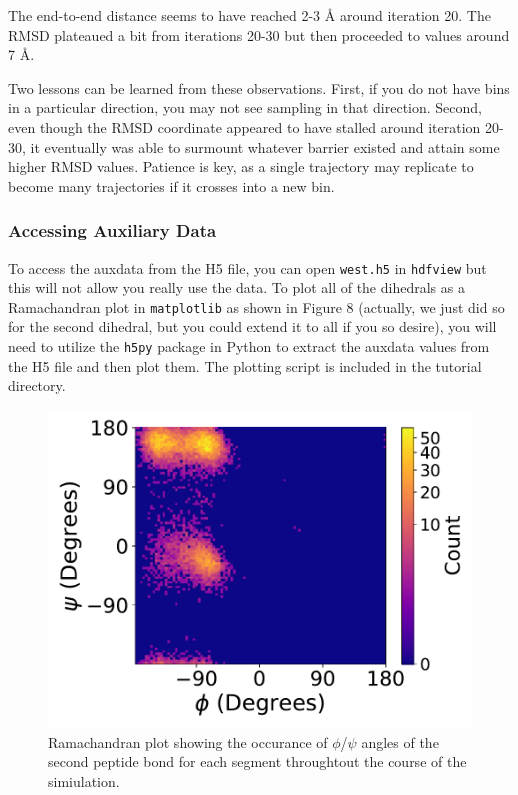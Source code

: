 \documentclass[9pt,tutorial,pubversion]{livecoms}
\begin{document}
The end-to-end distance seems to have reached 2-3 \AA{} around iteration 20. 
The RMSD plateaued a bit from iterations 20-30 but then proceeded to values around 7 \AA.  

Two lessons can be learned from these observations. 
First, if you do not have bins in a particular direction, you may not see sampling in that direction. 
Second, even though the RMSD coordinate appeared to have stalled around iteration 20-30, it eventually was able to surmount whatever barrier existed and attain some higher RMSD values. 
Patience is key, as a single trajectory may replicate to become many trajectories if it crosses into a new bin.

\subsubsection{Accessing Auxiliary Data}

To access the auxdata from the H5 file, you can open \verb|west.h5| in \verb|hdfview| but this will not allow you really use the data. 
To plot all of the dihedrals as a Ramachandran plot in \verb|matplotlib| as shown in Figure 8 (actually, we just did so for the second dihedral, but you could extend it to all if you so desire), you will need to utilize the \verb|h5py| package in Python to extract the auxdata values from the H5 file and then plot them. 
The plotting script is included in the tutorial directory.

\begin{figure}
\includegraphics[width=\linewidth]{Figure8.pdf}
\caption{Ramachandran plot showing the occurance of $\phi$/$\psi$ angles of the second peptide bond for each segment throughtout the course of the simiulation.}
\label{fig:view}
\end{figure}
\end{document}
